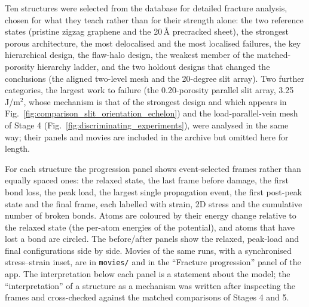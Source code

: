 Ten structures were selected from the database for detailed fracture analysis, chosen for what they teach rather than for their strength alone: the two reference states (pristine zigzag graphene and the 20\,\AA{} precracked sheet), the strongest porous architecture, the most delocalised and the most localised failures, the key hierarchical design, the flaw-halo design, the weakest member of the matched-porosity hierarchy ladder, and the two holdout designs that changed the conclusions (the aligned two-level mesh and the 20-degree slit array). Two further categories, the largest work to failure (the 0.20-porosity parallel slit array, 3.25\,J/m$^2$, whose mechanism is that of the strongest design and which appears in Fig.~\ref{fig:comparison_slit_orientation_echelon}) and the load-parallel-vein mesh of Stage 4 (Fig.~\ref{fig:discriminating_experiments}), were analysed in the same way; their panels and movies are included in the archive but omitted here for length.

For each structure the progression panel shows event-selected frames rather than equally spaced ones: the relaxed state, the last frame before damage, the first bond loss, the peak load, the largest single propagation event, the first post-peak state and the final frame, each labelled with strain, 2D stress and the cumulative number of broken bonds. Atoms are coloured by their energy change relative to the relaxed state (the per-atom energies of the potential), and atoms that have lost a bond are circled. The before/after panels show the relaxed, peak-load and final configurations side by side. Movies of the same runs, with a synchronised stress--strain inset, are in \texttt{movies/} and in the ``Fracture progression'' panel of the app. The interpretation below each panel is a statement about the model; the ``interpretation'' of a structure as a mechanism was written after inspecting the frames and cross-checked against the matched comparisons of Stages 4 and 5.
